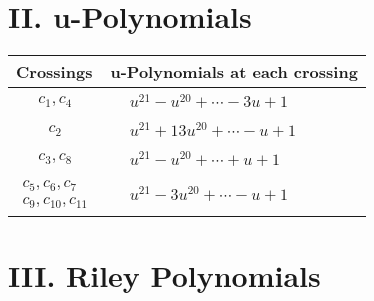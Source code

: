 \documentclass[1p]{elsarticle_modified}
\theoremstyle{definition}
\begin{document}
\newpage\renewcommand{\arraystretch}{1}
\centering \section*{ II. u-Polynomials}
\begin{tabular}{m{50pt}|m{274pt}}
Crossings & \hspace{64pt}u-Polynomials at each crossing \\
\hline $$\begin{aligned}c_{1},c_{4}\end{aligned}$$&$\begin{aligned}
&u^{21}- u^{20}+\cdots-3 u+1
\end{aligned}$\\
\hline $$\begin{aligned}c_{2}\end{aligned}$$&$\begin{aligned}
&u^{21}+13 u^{20}+\cdots- u+1
\end{aligned}$\\
\hline $$\begin{aligned}c_{3},c_{8}\end{aligned}$$&$\begin{aligned}
&u^{21}- u^{20}+\cdots+u+1
\end{aligned}$\\
\hline $$\begin{aligned}c_{5},c_{6},c_{7}\\c_{9},c_{10},c_{11}\end{aligned}$$&$\begin{aligned}
&u^{21}-3 u^{20}+\cdots- u+1
\end{aligned}$\\
\hline
\end{tabular}\newpage\renewcommand{\arraystretch}{1}
\centering \section*{ III. Riley Polynomials}
\end{document}
